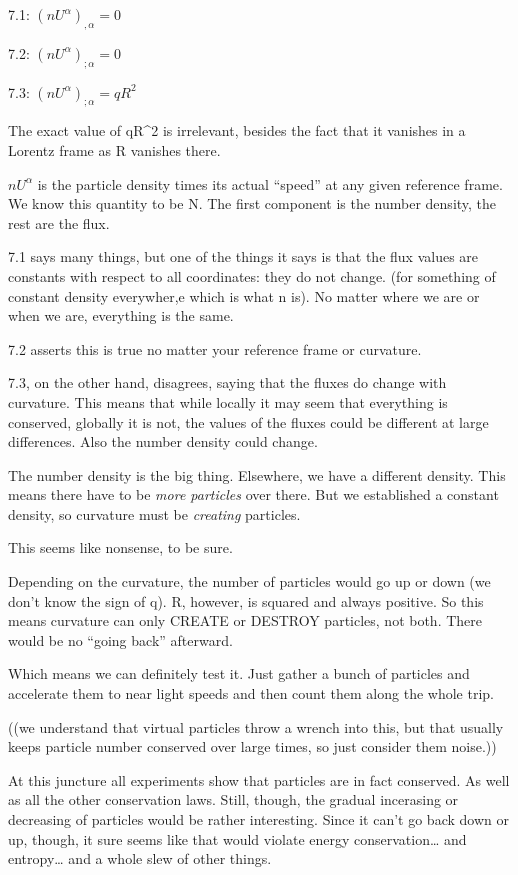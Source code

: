 \documentclass[landscape,letterpaper,10pt,english]{article}
\begin{document}
    7.1: \((nU^\alpha)_{,\alpha}=0\)

7.2: \((nU^\alpha)_{;\alpha}=0\)

7.3: \((nU^\alpha)_{;\alpha}=qR^2\)

The exact value of qR\^{}2 is irrelevant, besides the fact that it
vanishes in a Lorentz frame as R vanishes there.

\(nU^\alpha\) is the particle density times its actual ``speed'' at any
given reference frame. We know this quantity to be N. The first
component is the number density, the rest are the flux.

7.1 says many things, but one of the things it says is that the flux
values are constants with respect to all coordinates: they do not
change. (for something of constant density everywher,e which is what n
is). No matter where we are or when we are, everything is the same.

7.2 asserts this is true no matter your reference frame or curvature.

7.3, on the other hand, disagrees, saying that the fluxes do change with
curvature. This means that while locally it may seem that everything is
conserved, globally it is not, the values of the fluxes could be
different at large differences. Also the number density could change.

The number density is the big thing. Elsewhere, we have a different
density. This means there have to be \emph{more particles} over there.
But we established a constant density, so curvature must be
\emph{creating} particles.

This seems like nonsense, to be sure.

Depending on the curvature, the number of particles would go up or down
(we don't know the sign of q). R, however, is squared and always
positive. So this means curvature can only CREATE or DESTROY particles,
not both. There would be no ``going back'' afterward.

Which means we can definitely test it. Just gather a bunch of particles
and accelerate them to near light speeds and then count them along the
whole trip.

((we understand that virtual particles throw a wrench into this, but
that usually keeps particle number conserved over large times, so just
consider them noise.))

At this juncture all experiments show that particles are in fact
conserved. As well as all the other conservation laws. Still, though,
the gradual incerasing or decreasing of particles would be rather
interesting. Since it can't go back down or up, though, it sure seems
like that would violate energy conservation\ldots{} and entropy\ldots{}
and a whole slew of other things.
\end{document}
